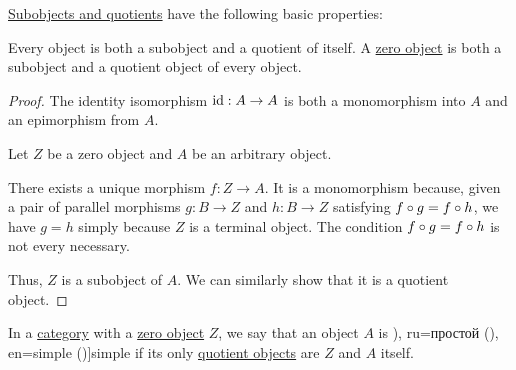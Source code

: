 \begin{proposition}\label{thm:def:subobject_and_quotient}
  \hyperref[def:subobject_and_quotient]{Subobjects and quotients} have the following basic properties:
  \begin{thmenum}
     Every object is both a subobject and a quotient of itself.
     A \hyperref[def:universal_objects/zero]{zero object} is both a subobject and a quotient object of every object.
  \end{thmenum}
\end{proposition}
\begin{proof}
   The identity isomorphism \( \operatorname{id}: A \to A \) is both a monomorphism into \( A \) and an epimorphism from \( A \).

   Let \( Z \) be a zero object and \( A \) be an arbitrary object.

  There exists a unique morphism \( f: Z \to A \). It is a monomorphism because, given a pair of parallel morphisms \( g: B \to Z \) and \( h: B \to Z \) satisfying \( f \bincirc g = f \bincirc h \), we have \( g = h \) simply because \( Z \) is a terminal object. The condition \( f \bincirc g = f \bincirc h \) is not every necessary.

  Thus, \( Z \) is a subobject of \( A \). We can similarly show that it is a quotient object.
\end{proof}

\begin{definition}\label{def:simple_object}\mimprovised
  In a \hyperref[def:category]{category} with a \hyperref[def:universal_objects/zero]{zero object} \( Z \), we say that an object \( A \) is \term[bg=прост (\cite[307]{ГеновМиховскиМоллов1991}), ru=простой (\cite[99]{Шафаревич1999}), en=simple (\cite[643]{Lang2002})]{simple} if its only \hyperref[def:subobject_and_quotient]{quotient objects} are \( Z \) and \( A \) itself.
\end{definition}


